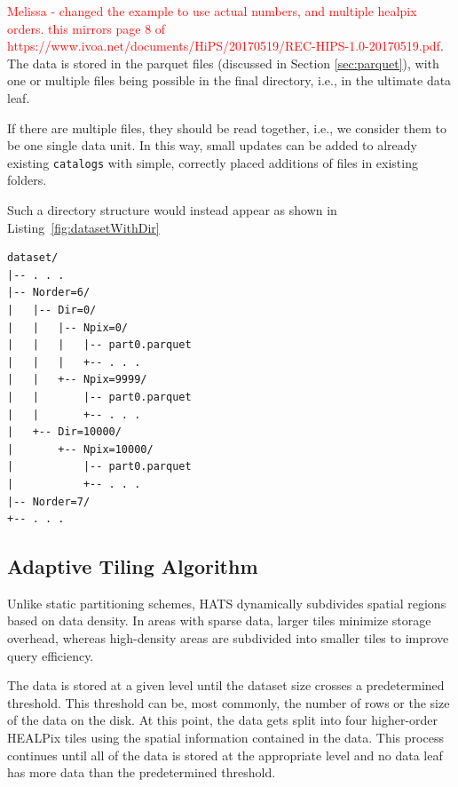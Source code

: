 \documentclass[11pt,a4paper]{ivoa}
\begin{document}
\textcolor{red}{Melissa - changed the example to use actual numbers, and multiple healpix orders. this mirrors page 8 of https://www.ivoa.net/documents/HiPS/20170519/REC-HIPS-1.0-20170519.pdf}. 
The data is stored in the parquet files (discussed in Section \ref{sec:parquet}), with one or multiple files being possible in the final directory, i.e., in the ultimate data leaf.  \par 
If there are multiple files, they should be read together, i.e., we consider them to be one single data unit. 
In this way, small updates can be added to already existing  \texttt{catalogs} with simple, correctly placed additions of files in existing folders.

Such a directory structure would instead appear as shown in Listing~\ref{fig:datasetWithDir}

\begin{minipage}{\linewidth}
\begin{lstlisting}[caption=Example catalog dataset directory contents with leaf directories, label=fig:datasetWithDir]
dataset/
|-- . . .
|-- Norder=6/
|   |-- Dir=0/
|   |   |-- Npix=0/
|   |   |   |-- part0.parquet
|   |   |   +-- . . .
|   |   +-- Npix=9999/
|   |       |-- part0.parquet
|   |       +-- . . .
|   +-- Dir=10000/
|       +-- Npix=10000/
|           |-- part0.parquet
|           +-- . . .
|-- Norder=7/
+-- . . .
\end{lstlisting} 
\end{minipage} 

    \subsection{Adaptive Tiling Algorithm} \label{sec:adaptive}
    Unlike static partitioning schemes, HATS dynamically subdivides spatial regions based on data density. In areas with sparse data, larger tiles minimize storage overhead, whereas high-density areas are subdivided into smaller tiles to improve query efficiency. \par
	The data is stored at a given level until the dataset size crosses a predetermined threshold. This threshold can be, most commonly, the number of rows or the size of the data on the disk. At this point, the data gets split into four higher-order HEALPix tiles using the spatial information contained in the data. This process continues until all of the data is stored at the appropriate level and no data leaf has more data than the predetermined threshold.
\end{document}

